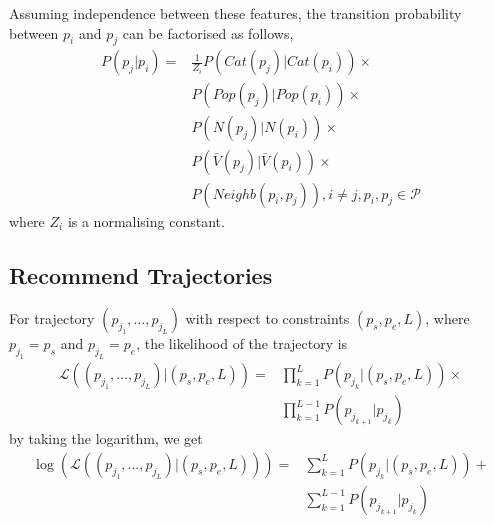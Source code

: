 \documentclass{sig-alternate-05-2015}
\begin{document}
Assuming independence between these features,
the transition probability between $p_i$ and $p_j$ can be factorised as follows,
\begin{align*}
    P(p_j | p_i) = & \frac{1}{Z_i} P(Cat(p_j) | Cat(p_i)) \times \\ 
                   & P(Pop(p_j) | Pop(p_i)) \times \\
                   & P(N(p_j) | N(p_i)) \times \\
                   & P(\bar{V}(p_j) | \bar{V}(p_i)) \times \\
                   & P(Neighb(p_i, p_j)), i \ne j, p_i, p_j \in \mathcal{P}
\end{align*}
where $Z_i$ is a normalising constant.


\subsection{Recommend Trajectories}

For trajectory $(p_{j_1}, \dots, p_{j_L})$ with respect to constraints $(p_s, p_e, L)$, 
where $p_{j_1} = p_s$ and $p_{j_L} = p_e$, 
the likelihood of the trajectory is
\begin{align*}
    \mathcal{L}((p_{j_1}, \dots, p_{j_L}) | (p_s, p_e, L)) =& \prod_{k=1}^L P(p_{j_k} |(p_s, p_e, L)) \times \\
                                                            & \prod_{k=1}^{L-1} P(p_{j_{k+1}} | p_{j_k})
\end{align*}
by taking the logarithm, we get 
\begin{align*}
    \log \left( \mathcal{L}((p_{j_1}, \dots, p_{j_L}) | (p_s, p_e, L)) \right) =& \sum_{k=1}^L P(p_{j_k} |(p_s, p_e, L)) + \\
                                                                                & \sum_{k=1}^{L-1} P(p_{j_{k+1}} | p_{j_k})
\end{align*}
\end{document}
